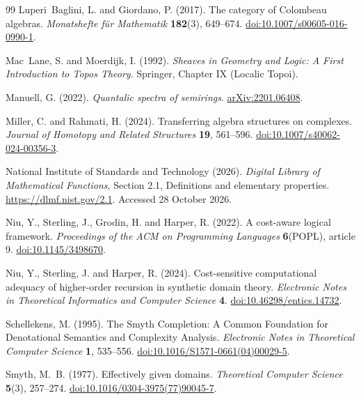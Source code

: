 \documentclass[11pt,a4paper]{article}
\numberwithin{algorithm}{section}
\numberwithin{equation}{section}
\theoremstyle{definition}
\theoremstyle{remark}
\theoremstyle{plain}
\theoremstyle{definition}
\theoremstyle{plain}
\begin{document}
\begin{thebibliography}{99}
Luperi~Baglini, L. and Giordano, P. (2017).
The category of {Colombeau} algebras.
\emph{Monatshefte f{\"u}r Mathematik} \textbf{182}(3), 649--674.
\href{https://doi.org/10.1007/s00605-016-0990-1}{doi:10.1007/s00605-016-0990-1}.

Mac~Lane, S. and Moerdijk, I. (1992).
\emph{Sheaves in Geometry and Logic: A First Introduction to
Topos Theory}.
Springer, Chapter IX (Localic Topoi).

Manuell, G. (2022).
\emph{Quantalic spectra of semirings}.
\href{https://arxiv.org/abs/2201.06408}{arXiv:2201.06408}.

Miller, C. and Rahmati, H. (2024).
Transferring algebra structures on complexes.
\emph{Journal of Homotopy and Related Structures}
\textbf{19}, 561--596.
\href{https://doi.org/10.1007/s40062-024-00356-3}
{doi:10.1007/s40062-024-00356-3}.

National Institute of Standards and Technology (2026).
\emph{Digital Library of Mathematical Functions},
Section 2.1, Definitions and elementary properties.
\url{https://dlmf.nist.gov/2.1}. Accessed 28 October 2026.

Niu, Y., Sterling, J., Grodin, H. and Harper, R. (2022).
A cost-aware logical framework.
\emph{Proceedings of the ACM on Programming Languages} \textbf{6}(POPL), article 9.
\href{https://doi.org/10.1145/3498670}{doi:10.1145/3498670}.

Niu, Y., Sterling, J. and Harper, R. (2024).
Cost-sensitive computational adequacy of higher-order recursion in synthetic domain theory.
\emph{Electronic Notes in Theoretical Informatics and Computer Science} \textbf{4}.
\href{https://doi.org/10.46298/entics.14732}{doi:10.46298/entics.14732}.

Schellekens, M. (1995).
The {Smyth} Completion: A Common Foundation for Denotational Semantics and Complexity Analysis.
\emph{Electronic Notes in Theoretical Computer Science} \textbf{1}, 535--556.
\href{https://doi.org/10.1016/S1571-0661(04)00029-5}{doi:10.1016/S1571-0661(04)00029-5}.

Smyth, M.~B. (1977).
Effectively given domains.
\emph{Theoretical Computer Science} \textbf{5}(3), 257--274.
\href{https://doi.org/10.1016/0304-3975(77)90045-7}{doi:10.1016/0304-3975(77)90045-7}.


\end{thebibliography}
\end{document}
